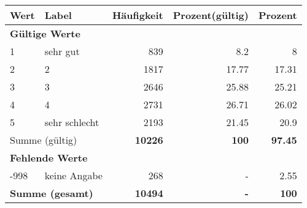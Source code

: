      \begin{longtable}{lXrrr}
     \toprule
     \textbf{Wert} & \textbf{Label} & \textbf{Häufigkeit} & \textbf{Prozent(gültig)} & \textbf{Prozent} \\
     \endhead
     \midrule
     \multicolumn{5}{l}{\textbf{Gültige Werte}}\\

     1 &
     \multicolumn{1}{X}{ sehr gut   } &


       \num{839} &
       \num[round-mode=places,round-precision=2]{8,2} &
         \num[round-mode=places,round-precision=2]{8} \\

     2 &
     \multicolumn{1}{X}{ 2   } &


       \num{1817} &
       \num[round-mode=places,round-precision=2]{17,77} &
         \num[round-mode=places,round-precision=2]{17,31} \\

     3 &
     \multicolumn{1}{X}{ 3   } &


       \num{2646} &
       \num[round-mode=places,round-precision=2]{25,88} &
         \num[round-mode=places,round-precision=2]{25,21} \\

     4 &
     \multicolumn{1}{X}{ 4   } &


       \num{2731} &
       \num[round-mode=places,round-precision=2]{26,71} &
         \num[round-mode=places,round-precision=2]{26,02} \\

     5 &
     \multicolumn{1}{X}{ sehr schlecht   } &


       \num{2193} &
       \num[round-mode=places,round-precision=2]{21,45} &
         \num[round-mode=places,round-precision=2]{20,9} \\
     \midrule
     \multicolumn{2}{l}{Summe (gültig)} &
       \textbf{\num{10226}} &
     \textbf{100} &
       \textbf{\num[round-mode=places,round-precision=2]{97,45}} \\
     \multicolumn{5}{l}{\textbf{Fehlende Werte}}\\
       -998 &
       keine Angabe &
         \num{268} &
        - &
         \num[round-mode=places,round-precision=2]{2,55} \\
     \midrule
     \multicolumn{2}{l}{\textbf{Summe (gesamt)}} &
          \textbf{\num{10494}} &
        \textbf{-} &
        \textbf{100} \\
     \bottomrule
     \end{longtable}
     
